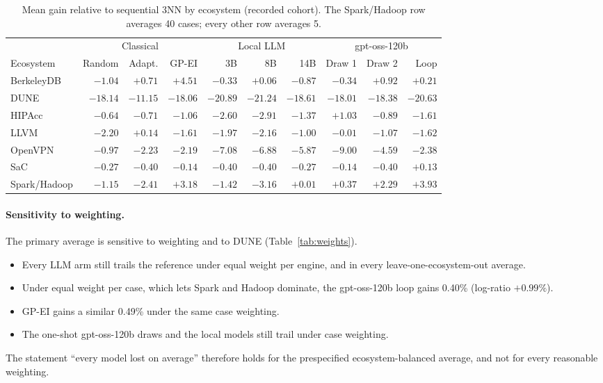 \begin{table}[t]
\centering
\caption{Mean gain relative to sequential 3NN by ecosystem (recorded cohort). The Spark/Hadoop row averages 40 cases; every other row averages 5.}
\label{tab:eco}
\small
\setlength{\tabcolsep}{4pt}
\begin{tabular}{lrrrrrrrrr}
\toprule
 & \multicolumn{3}{c}{Classical} & \multicolumn{3}{c}{Local LLM} & \multicolumn{3}{c}{gpt-oss-120b} \\
\cmidrule(lr){2-4}\cmidrule(lr){5-7}\cmidrule(lr){8-10}
Ecosystem & Random & Adapt. & GP-EI & 3B & 8B & 14B & Draw 1 & Draw 2 & Loop \\
\midrule
BerkeleyDB & $-1.04$ & $+0.71$ & $+4.51$ & $-0.33$ & $+0.06$ & $-0.87$ & $-0.34$ & $+0.92$ & $+0.21$ \\
DUNE & $-18.14$ & $-11.15$ & $-18.06$ & $-20.89$ & $-21.24$ & $-18.61$ & $-18.01$ & $-18.38$ & $-20.63$ \\
HIPAcc & $-0.64$ & $-0.71$ & $-1.06$ & $-2.60$ & $-2.91$ & $-1.37$ & $+1.03$ & $-0.89$ & $-1.61$ \\
LLVM & $-2.20$ & $+0.14$ & $-1.61$ & $-1.97$ & $-2.16$ & $-1.00$ & $-0.01$ & $-1.07$ & $-1.62$ \\
OpenVPN & $-0.97$ & $-2.23$ & $-2.19$ & $-7.08$ & $-6.88$ & $-5.87$ & $-9.00$ & $-4.59$ & $-2.38$ \\
SaC & $-0.27$ & $-0.40$ & $-0.14$ & $-0.40$ & $-0.40$ & $-0.27$ & $-0.14$ & $-0.40$ & $+0.13$ \\
Spark/Hadoop & $-1.15$ & $-2.41$ & $+3.18$ & $-1.42$ & $-3.16$ & $+0.01$ & $+0.37$ & $+2.29$ & $+3.93$ \\
\bottomrule
\end{tabular}
\end{table}

\paragraph{Sensitivity to weighting.} The primary average is sensitive to weighting and to DUNE (Table~\ref{tab:weights}).
\begin{itemize}
  \item Every LLM arm still trails the reference under equal weight per engine, and in every leave-one-ecosystem-out average.
  \item Under equal weight per case, which lets Spark and Hadoop dominate, the gpt-oss-120b loop gains 0.40\% (log-ratio $+0.99\%$).
  \item GP-EI gains a similar 0.49\% under the same case weighting.
  \item The one-shot gpt-oss-120b draws and the local models still trail under case weighting.
\end{itemize}
The statement ``every model lost on average'' therefore holds for the prespecified ecosystem-balanced average, and not for every reasonable weighting.

